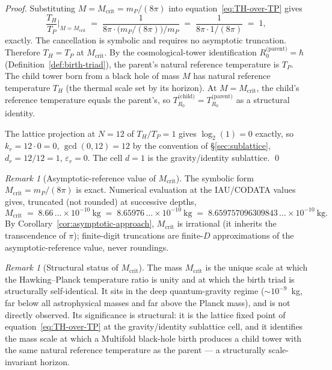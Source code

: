 \documentclass[11pt,a4paper]{article}
\theoremstyle{definition}
\theoremstyle{remark}
\newtheorem{remark}[theorem]{Remark}
\begin{document}
\begin{proof}
Substituting $M = M_{\mathrm{crit}} = m_{P}/(8\pi)$ into equation~\eqref{eq:TH-over-TP} gives
\[
\frac{T_{H}}{T_{P}}\bigg|_{M = M_{\mathrm{crit}}} \;=\; \frac{1}{8\pi \cdot \bigl(m_{P}/(8\pi)\bigr)/m_{P}} \;=\; \frac{1}{8\pi \cdot 1/(8\pi)} \;=\; 1,
\]
exactly. The cancellation is symbolic and requires no asymptotic truncation. Therefore $T_{H} = T_{P}$ at $M_{\mathrm{crit}}$. By the cosmological-tower identification $R_{0}^{\text{(parent)}} = \hbar$ (Definition~\ref{def:birth-triad}), the parent's natural reference temperature is $T_{P}$. The child tower born from a black hole of mass $M$ has natural reference temperature $T_{H}$ (the thermal scale set by its horizon). At $M = M_{\mathrm{crit}}$, the child's reference temperature equals the parent's, so $T^{\text{(child)}}_{R_{0}} = T^{\text{(parent)}}_{R_{0}}$ as a structural identity.

The lattice projection at $N=12$ of $T_{H}/T_{P} = 1$ gives $\log_{2}(1) = 0$ exactly, so $k_{r} = 12 \cdot 0 = 0$, $\gcd(0,12) = 12$ by the convention of \S\ref{sec:sublattice}, $d_{r} = 12/12 = 1$, $\varepsilon_{r} = 0$. The cell $d = 1$ is the gravity/identity sublattice. \qed
\end{proof}

\begin{remark}[Asymptotic-reference value of $M_{\mathrm{crit}}$]\label{rem:Mcrit-asymptotic}
The symbolic form $M_{\mathrm{crit}} = m_{P}/(8\pi)$ is exact. Numerical evaluation at the IAU/CODATA values gives, truncated (not rounded) at successive depths,
\[
M_{\mathrm{crit}} \;=\; 8.66\,\ldots\times 10^{-10}~\text{kg} \;=\; 8.65976\,\ldots\times 10^{-10}~\text{kg} \;=\; 8.659757096309843\,\ldots\times 10^{-10}~\text{kg}.
\]
By Corollary~\ref{cor:asymptotic-approach}, $M_{\mathrm{crit}}$ is irrational (it inherits the transcendence of $\pi$); finite-digit truncations are finite-$D$ approximations of the asymptotic-reference value, never roundings.
\end{remark}

\begin{remark}[Structural status of $M_{\mathrm{crit}}$]\label{rem:Mcrit-structural}
The mass $M_{\mathrm{crit}}$ is the unique scale at which the Hawking--Planck temperature ratio is unity and at which the birth triad is structurally self-identical. It sits in the deep quantum-gravity regime ($\sim 10^{-9}$~kg, far below all astrophysical masses and far above the Planck mass), and is not directly observed. Its significance is structural: it is the lattice fixed point of equation~\eqref{eq:TH-over-TP} at the gravity/identity sublattice cell, and it identifies the mass scale at which a Multifold black-hole birth produces a child tower with the same natural reference temperature as the parent --- a structurally scale-invariant horizon.
\end{remark}
\end{document}
